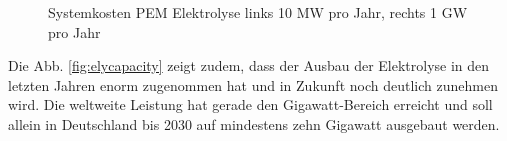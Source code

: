 \begin{figure}
	\centering
	\qquad
	\caption{Systemkosten \gls{PEM} Elektrolyse links 10 MW pro Jahr, rechts 1 GW pro Jahr \cite{IRENA2020}}
	\label{fig:elycost}
\end{figure}
Die Abb. \ref{fig:elycapacity} zeigt zudem, dass der Ausbau der Elektrolyse in den letzten Jahren enorm zugenommen hat und in Zukunft noch deutlich zunehmen wird. Die weltweite Leistung hat gerade den Gigawatt-Bereich erreicht und soll allein in Deutschland bis 2030 auf mindestens zehn Gigawatt ausgebaut werden.\\
